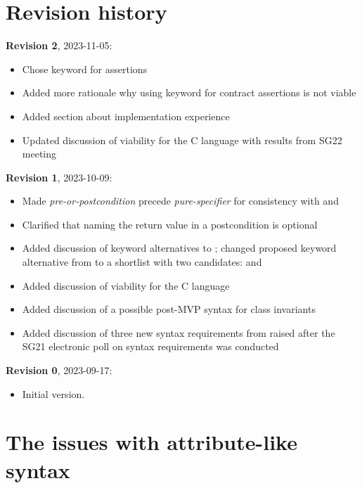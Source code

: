 \section*{Revision history}
\textbf{Revision 2}, 2023-11-05:
\begin{itemize}
\item Chose keyword  for assertions
\item Added more rationale why using keyword  for contract assertions is not viable
\item Added section about implementation experience
\item Updated discussion of viability for the C language with results from SG22 meeting
\end{itemize}
\textbf{Revision 1}, 2023-10-09: 
\begin{itemize}
\item Made \emph{pre-or-postcondition} precede \emph{pure-specifier} for consistency with  and 
\item Clarified that naming the return value in a postcondition is optional
\item Added discussion of keyword alternatives to ; changed proposed keyword alternative from  to a shortlist with two candidates:  and 
\item Added discussion of viability for the C language
\item Added discussion of a possible post-MVP syntax for class invariants
\item Added discussion of three new syntax requirements from \cite{P2885R3} raised after the SG21 electronic poll on syntax requirements was conducted
\end{itemize}
\textbf{Revision 0}, 2023-09-17: 
\begin{itemize}
\item Initial version.
\end{itemize}



\section{The issues with attribute-like syntax}
\label{sec:motivation}

